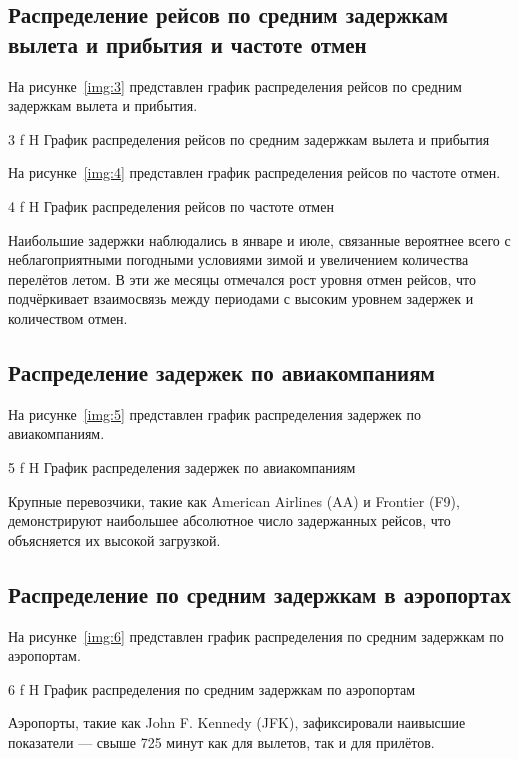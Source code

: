 \subsection{Распределение рейсов по средним задержкам вылета и прибытия и частоте отмен}

На рисунке~\ref{img:3} представлен график распределения рейсов по средним задержкам вылета и прибытия.

{3}
{f}
{H}
{\textwidth}
{График распределения рейсов по средним задержкам вылета и прибытия}

На рисунке~\ref{img:4} представлен график распределения рейсов по частоте отмен.

{4}
{f}
{H}
{\textwidth}
{График распределения рейсов по частоте отмен}

Наибольшие задержки наблюдались в январе и июле, связанные вероятнее всего с неблагоприятными погодными условиями зимой и увеличением количества перелётов летом.
В эти же месяцы отмечался рост уровня отмен рейсов, что подчёркивает взаимосвязь между периодами с высоким уровнем задержек и количеством отмен.

\subsection{Распределение задержек по авиакомпаниям}

На рисунке~\ref{img:5} представлен график распределения задержек по авиакомпаниям.

{5}
{f}
{H}
{\textwidth}
{График распределения задержек по авиакомпаниям}

Крупные перевозчики, такие как American Airlines (AA) и Frontier (F9), демонстрируют наибольшее абсолютное число задержанных рейсов, что объясняется их высокой загрузкой.

\subsection{Распределение по средним задержкам в аэропортах}

На рисунке~\ref{img:6} представлен график распределения по средним задержкам по аэропортам.

{6}
{f}
{H}
{\textwidth}
{График распределения по средним задержкам по аэропортам}

Аэропорты, такие как John F. Kennedy (JFK), зафиксировали наивысшие показатели --- свыше 725 минут как для вылетов, так и для прилётов.

